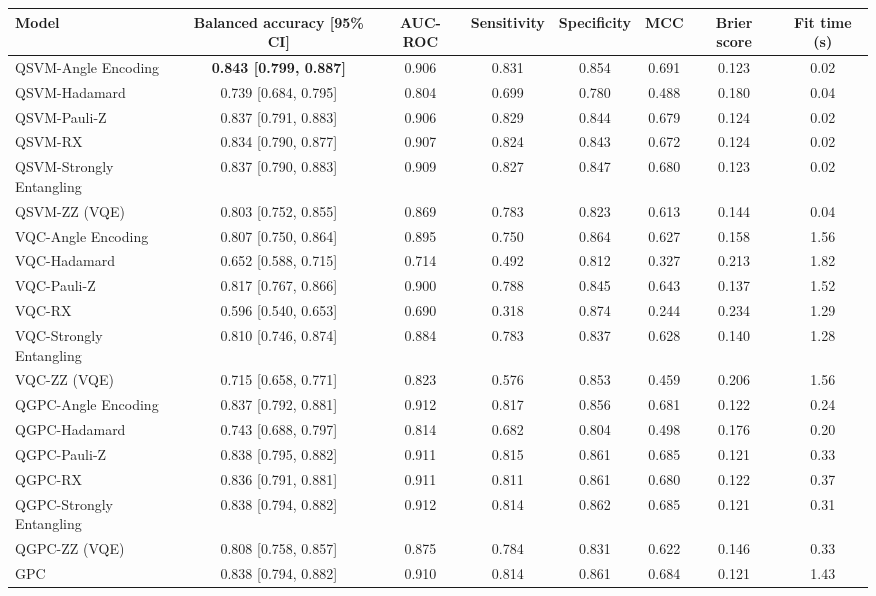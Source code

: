 \begin{tabular}{lccccccc}
\toprule
Model & Balanced accuracy [95\% CI] & AUC-ROC & Sensitivity & Specificity & MCC & Brier score & Fit time (s) \\
\midrule
QSVM-Angle Encoding & \textbf{0.843 [0.799, 0.887]} & 0.906 & 0.831 & 0.854 & 0.691 & 0.123 & 0.02 \\
QSVM-Hadamard & 0.739 [0.684, 0.795] & 0.804 & 0.699 & 0.780 & 0.488 & 0.180 & 0.04 \\
QSVM-Pauli-Z & 0.837 [0.791, 0.883] & 0.906 & 0.829 & 0.844 & 0.679 & 0.124 & 0.02 \\
QSVM-RX & 0.834 [0.790, 0.877] & 0.907 & 0.824 & 0.843 & 0.672 & 0.124 & 0.02 \\
QSVM-Strongly Entangling & 0.837 [0.790, 0.883] & 0.909 & 0.827 & 0.847 & 0.680 & 0.123 & 0.02 \\
QSVM-ZZ (VQE) & 0.803 [0.752, 0.855] & 0.869 & 0.783 & 0.823 & 0.613 & 0.144 & 0.04 \\
\midrule
VQC-Angle Encoding & 0.807 [0.750, 0.864] & 0.895 & 0.750 & 0.864 & 0.627 & 0.158 & 1.56 \\
VQC-Hadamard & 0.652 [0.588, 0.715] & 0.714 & 0.492 & 0.812 & 0.327 & 0.213 & 1.82 \\
VQC-Pauli-Z & 0.817 [0.767, 0.866] & 0.900 & 0.788 & 0.845 & 0.643 & 0.137 & 1.52 \\
VQC-RX & 0.596 [0.540, 0.653] & 0.690 & 0.318 & 0.874 & 0.244 & 0.234 & 1.29 \\
VQC-Strongly Entangling & 0.810 [0.746, 0.874] & 0.884 & 0.783 & 0.837 & 0.628 & 0.140 & 1.28 \\
VQC-ZZ (VQE) & 0.715 [0.658, 0.771] & 0.823 & 0.576 & 0.853 & 0.459 & 0.206 & 1.56 \\
\midrule
QGPC-Angle Encoding & 0.837 [0.792, 0.881] & 0.912 & 0.817 & 0.856 & 0.681 & 0.122 & 0.24 \\
QGPC-Hadamard & 0.743 [0.688, 0.797] & 0.814 & 0.682 & 0.804 & 0.498 & 0.176 & 0.20 \\
QGPC-Pauli-Z & 0.838 [0.795, 0.882] & 0.911 & 0.815 & 0.861 & 0.685 & 0.121 & 0.33 \\
QGPC-RX & 0.836 [0.791, 0.881] & 0.911 & 0.811 & 0.861 & 0.680 & 0.122 & 0.37 \\
QGPC-Strongly Entangling & 0.838 [0.794, 0.882] & 0.912 & 0.814 & 0.862 & 0.685 & 0.121 & 0.31 \\
QGPC-ZZ (VQE) & 0.808 [0.758, 0.857] & 0.875 & 0.784 & 0.831 & 0.622 & 0.146 & 0.33 \\
\midrule
GPC & 0.838 [0.794, 0.882] & 0.910 & 0.814 & 0.861 & 0.684 & 0.121 & 1.43 \\

\end{tabular}
